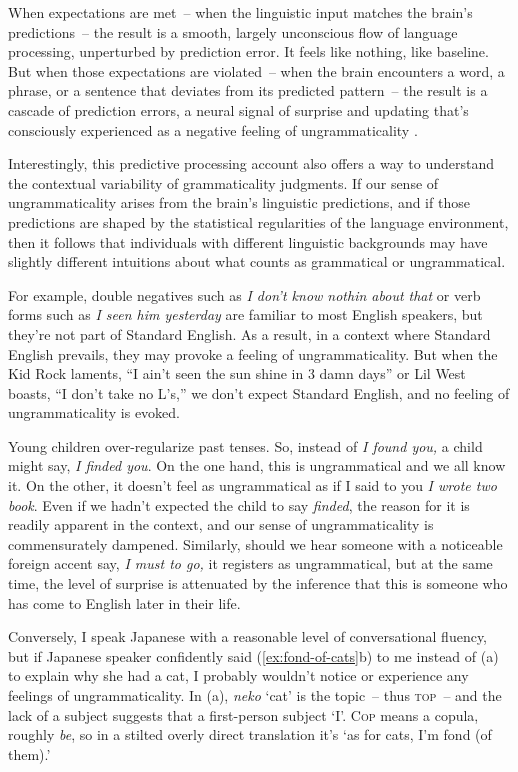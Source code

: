 When expectations are met~-- when the linguistic input matches the brain's predictions~-- the result is a smooth, largely unconscious flow of language processing, unperturbed by prediction error. It feels like nothing, like baseline. But when those expectations are violated~-- when the brain encounters a word, a phrase, or a sentence that deviates from its predicted pattern~-- the result is a cascade of prediction errors, a neural signal of surprise and updating that's consciously experienced as a negative feeling of ungrammaticality \citep{FernandezVelasco2021}.

\bigskip

Interestingly, this predictive processing account also offers a way to understand the contextual variability of grammaticality judgments. If our sense of ungrammaticality arises from the brain's linguistic predictions, and if those predictions are shaped by the statistical regularities of the language environment, then it follows that individuals with different linguistic backgrounds may have slightly different intuitions about what counts as grammatical or ungrammatical.

For example, double negatives such as \textit{I don't know nothin about that} or verb forms such as \textit{I seen him yesterday} are familiar to most English speakers, but they're not part of Standard English. As a result, in a context where Standard English prevails, they may provoke a feeling of ungrammaticality. But when the Kid Rock laments, ``I ain't seen the sun shine in 3 damn days'' or Lil West boasts, ``I don't take no L's,'' we don't expect Standard English, and no feeling of ungrammaticality is evoked.

Young children over-regularize past tenses. So, instead of \textit{I found you,} a child might say, \textit{I finded you}. On the one hand, this is ungrammatical and we all know it. On the other, it doesn't feel as ungrammatical as if I said to you \textit{I wrote two book}. Even if we hadn't expected the child to say \textit{finded}, the reason for it is readily apparent in the context, and our sense of ungrammaticality is commensurately dampened. Similarly, should we hear someone with a noticeable foreign accent say, \textit{I must to go,} it registers as ungrammatical, but at the same time, the level of surprise is attenuated by the inference that this is someone who has come to English later in their life.

Conversely, I speak Japanese with a reasonable level of conversational fluency, but if Japanese speaker confidently said (\ref{ex:fond-of-cats}b) to me instead of (a) to explain why she had a cat, I probably wouldn't notice or experience any feelings of ungrammaticality. In (a), \textit{neko} `cat' is the topic~-- thus \textsc{top}~-- and the lack of a subject suggests that a first-person subject `I'. \textsc{Cop} means a copula, roughly \textit{be}, so in a stilted overly direct translation it's `as for cats, I'm fond (of them).'


